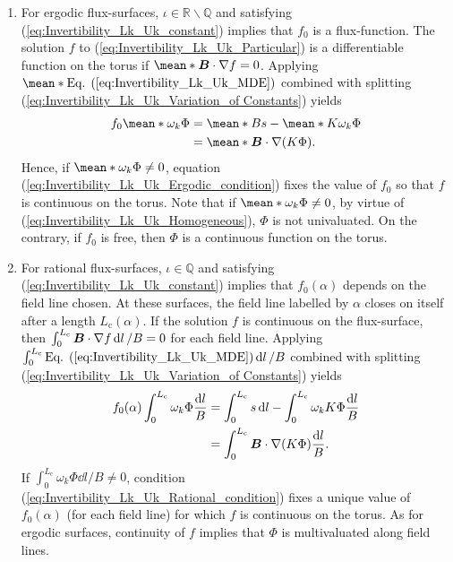 \begin{enumerate}
	\item For ergodic flux-surfaces, $\iota\in\mathbb{R}\backslash \mathbb{Q}$ and satisfying (\ref{eq:Invertibility_Lk_Uk_constant}) implies that $f_0$ is a flux-function. The solution $f$ to (\ref{eq:Invertibility_Lk_Uk_Particular}) is a differentiable function on the torus if $\mean*{\vb*{B}\cdot\nabla f} = 0$. Applying $\mean*{\text{Eq. (\ref{eq:Invertibility_Lk_Uk_MDE})}}$ combined with splitting (\ref{eq:Invertibility_Lk_Uk_Variation_of Constants}) yields
	\begin{align}
		f_0\mean*{\omega_k \Phi}  & = \mean*{B s} - \mean*{K \omega_k \Phi} \nonumber
		\\
		& = \mean*{\vb*{B}\cdot\nabla(K \Phi)}. \label{eq:Invertibility_Lk_Uk_Ergodic_condition}
	\end{align}
    Hence, if $\mean*{\omega_k \Phi} \ne 0$, equation (\ref{eq:Invertibility_Lk_Uk_Ergodic_condition}) fixes the value of $f_0$ so that $f$ is continuous on the torus. Note that if $\mean*{\omega_k \Phi} \ne 0$, by virtue of (\ref{eq:Invertibility_Lk_Uk_Homogeneous}), $\Phi$ is not univaluated. On the contrary, if $f_0$ is free, then $\Phi$ is a continuous function on the torus. 
    
    \item For rational flux-surfaces, $\iota\in \mathbb{Q}$ and satisfying (\ref{eq:Invertibility_Lk_Uk_constant}) implies that $f_0(\alpha)$ depends on the field line chosen. At these surfaces, the field line labelled by $\alpha$ closes on itself after a length $L_{\text{c}}(\alpha)$. If the solution $f$ is continuous on the flux-surface, then $\int_{0}^{L_{\text{c}}} \vb*{B}\cdot\nabla f \dd{l}/B=0$ for each field line. Applying $\int_{0}^{L_{\text{c}}} \text{Eq. (\ref{eq:Invertibility_Lk_Uk_MDE})}\dd{l}/B$ combined with splitting (\ref{eq:Invertibility_Lk_Uk_Variation_of Constants}) yields
    \begin{align}
    	f_0(\alpha)
    	\int_{0}^{L_{\text{c}}} \omega_k \Phi \frac{\dd{l}}{B}  
    	& =  
    	\int_{0}^{L_{\text{c}}} s \dd{l} - \int_{0}^{L_{\text{c}}} \omega_k K \Phi \frac{\dd{l}}{B}
    	\nonumber 
    	\\
    	& =  
        \int_{0}^{L_{\text{c}}} \vb*{B}\cdot\nabla(K \Phi) \frac{\dd{l}}{B}
    	. \label{eq:Invertibility_Lk_Uk_Rational_condition}
    \end{align}
    If $\int_{0}^{L_{\text{c}}} \omega_k \Phi {\dd{l}}/{B} \ne 0$, condition (\ref{eq:Invertibility_Lk_Uk_Rational_condition}) fixes a unique value of $f_0(\alpha)$ (for each field line) for which $f$ is continuous on the torus. As for ergodic surfaces, continuity of $f$ implies that $\Phi$ is multivaluated along field lines. 
\end{enumerate}
